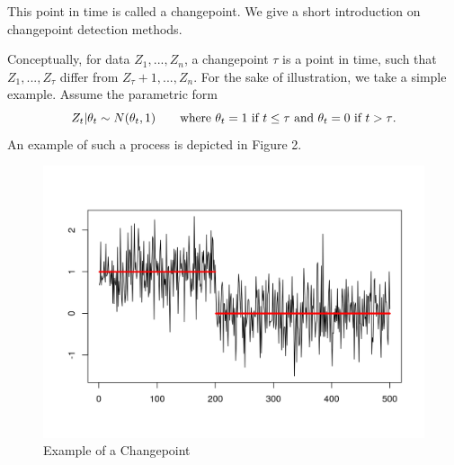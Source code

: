 \documentclass[11pt]{article}
\begin{document}
This point in time is called a changepoint. We give a short introduction on changepoint detection methods.
\par Conceptually, for data $Z_1,...,Z_n$, a changepoint $\tau$ is a point in time, such that $Z_1,...,Z_\tau$ differ from  $Z_\tau+1,...,Z_n$. For the sake of illustration, we take a simple example. Assume the parametric form
\begin{equation*}
	Z_t|\theta_t\sim N(\theta_t,1) \tag*{where $\theta_t=1 ~\text{if}~ t\leq\tau$ and $\theta_t=0 ~\text{if}~ t>\tau$}.
\end{equation*} An example of such a process is depicted in Figure 2.
\clearpage
\begin{figure}[h!]
	\centering
	\includegraphics[width=0.75\linewidth]{../img/changepointex.png}
	\caption{Example of a Changepoint}
\end{figure}
\end{document}
